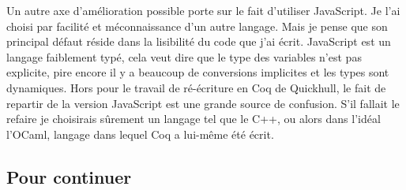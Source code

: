 \documentclass[]{article}
\begin{document}
Un autre axe d'amélioration possible porte sur le fait d'utiliser JavaScript. Je l'ai choisi par facilité et méconnaissance d'un autre langage. Mais je pense que son principal défaut réside dans la lisibilité du code que j'ai écrit. JavaScript est un langage faiblement typé, cela veut dire que le type des variables n'est pas explicite, pire encore il y a beaucoup de conversions implicites et les types sont dynamiques. Hors pour le travail de ré-écriture en Coq de Quickhull, le fait de repartir de la version JavaScript est une grande source de confusion. S'il fallait le refaire je choisirais sûrement un langage tel que le C++, ou alors dans l'idéal l'OCaml, langage dans lequel Coq a lui-même été écrit.

\subsection{Pour continuer}


\newpage


\end{document}
